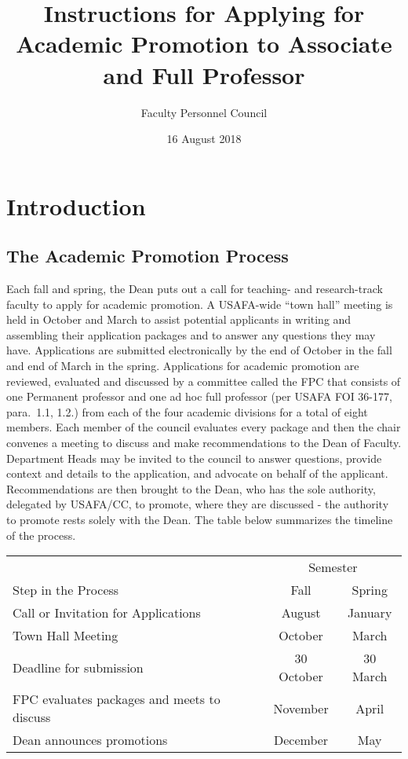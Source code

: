 \documentclass[11pt,titlepage]{article}
\title{Instructions for Applying for Academic Promotion to Associate and Full Professor}
\author{Faculty Personnel Council}
\date{16 August 2018}
\begin{document}
\maketitle

\section*{Introduction}\label{section:introduction}

\subsection*{The Academic Promotion Process}
Each fall and spring, the Dean puts out a call for teaching- and research-track faculty to apply for academic promotion.
A USAFA-wide ``town hall'' meeting is held in October and March to assist potential applicants in writing and assembling their application packages and to answer any questions they may have.
Applications are submitted electronically by the end of October in the fall and end of March in the spring.
Applications for academic promotion are reviewed, evaluated and discussed by a committee called the \gls{FPC} that consists of one Permanent professor and one ad hoc full professor (per USAFA FOI 36-177, para.~1.1, 1.2.) from each of the four academic divisions for a total of eight members.
Each member of the council evaluates every package and then the chair convenes a meeting to discuss and make recommendations to the Dean of Faculty.
Department Heads may be invited to the council to answer questions, provide context and details to the application, and advocate on behalf of the applicant.
Recommendations are then brought to the Dean, who has the sole authority, delegated by USAFA/CC, to promote, where they are discussed - the authority to promote rests solely with the Dean.
The table below summarizes the timeline of the process.

\begin{table}[!h]
  \centering
  \begin{tabular}{l cc}
    \toprule
    & \multicolumn{2}{c}{Semester}\\\cmidrule(r){2-3}
    Step in the Process & Fall & Spring\\
    \midrule
    Call or Invitation for Applications & August & January\\
    Town Hall Meeting & October & March\\
    Deadline for submission & 30 October & 30 March\\
    \Acrshort{FPC} evaluates packages and meets to discuss & November & April\\
    Dean announces promotions & December & May\\
    \bottomrule
  \end{tabular}
\end{table}
\end{document}

